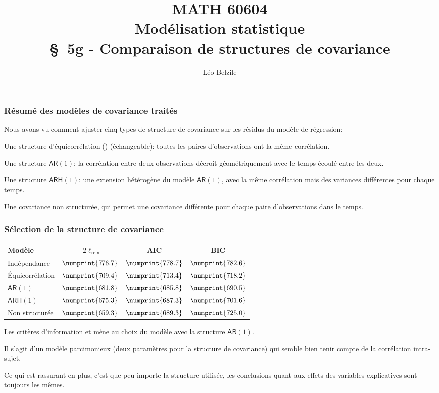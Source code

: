 \documentclass{beamer}
\title[\color{white}{MATH 60604 \S~5g - Comparaison de structures de covariance}]{\texorpdfstring{MATH 60604 \\Modélisation statistique \\ \S~5g - Comparaison de structures de covariance}{MATH 60604 \\Modélisation statistique \\ \S~5g - Comparaison de structures de covariance}}
\author{Léo Belzile}
\institute{HEC Montréal\\
Département de sciences de la décision}
\date{}
\begin{document}
\frame{\titlepage}

\begin{frame}[fragile]
\frametitle{Résumé des modèles de covariance traités}
\bi
\item Nous avons vu comment ajuster cinq types de structure de covariance sur les résidus du modèle de régression:
\bi

\item Une structure d'équicorrélation () (échangeable): toutes les paires d'observations ont la même corrélation.
\item Une structure \alert{$\mathsf{AR}(1)$}: la corrélation entre deux observations décroit géométriquement avec le temps écoulé entre les deux. 
\item Une structure \alert{$\mathsf{ARH}(1)$}: une extension hétérogène du modèle $\mathsf{AR}(1)$, avec la même corrélation mais des variances différentes pour chaque temps.
\item Une covariance \alert{non structurée}, qui permet une covariance différente pour chaque paire d'observations dans le temps.
\ei
\ei
\end{frame}

\begin{frame}[fragile]
\frametitle{Sélection de la structure de covariance}
\begin{center}
\begin{footnotesize}
\begin{tabular}{l c c c}
\toprule 
\textbf{Modèle} & $-2\ell_{\textrm{reml}}$ & \textbf{AIC} & \textbf{BIC} \\ \midrule
Indépendance & $ \numprint{776.7}$ & $ \numprint{778.7}$ & $\numprint{782.6}$ \\ 
Équicorrélation & $\numprint{709.4}$ & $ \numprint{713.4}$ & $\numprint{718.2}$ \\ 
$\mathsf{AR}(1)$ & $\numprint{681.8}$ & \alert{$\numprint{685.8}$} & \alert{$ \numprint{690.5}$} \\ 
$\mathsf{ARH}(1)$ & $ \numprint{675.3}$ & $ \numprint{687.3}$ & $ \numprint{701.6}$ \\ 
Non structurée & $ \numprint{659.3}$ & $ \numprint{689.3}$ & $ \numprint{725.0}$ \\ \bottomrule
\end{tabular}
\end{footnotesize}
\end{center}
\bi
\item  Les critères d'information \AIC{} et \BIC{} mène au choix du modèle avec la structure $\mathsf{AR}(1)$. 
\item Il s'agit d'un modèle parcimonieux (deux paramètres pour la structure de covariance) qui semble bien tenir compte de la corrélation intra-sujet.
\item Ce qui est rassurant en plus, c'est que peu importe la structure utilisée, les conclusions quant aux effets des variables explicatives sont toujours les mêmes.
\ei
\end{frame}
\end{document}
